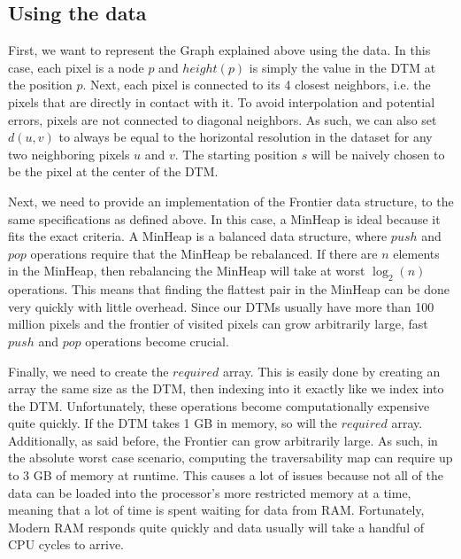 \documentclass[12pt]{article}
\begin{document}
\subsection{Using the data}
\label{sub:using_the_data}
\par First, we want to represent the Graph explained above using the data. In this case, each pixel is a node $p$ and $height(p)$ is simply the value in the DTM at the position $p$. Next, each pixel is connected to its 4 closest neighbors, i.e. the pixels that are directly in contact with it. To avoid interpolation and potential errors, pixels are not connected to diagonal neighbors. As such, we can also set $d(u,v)$ to always be equal to the horizontal resolution in the dataset for any two neighboring pixels $u$ and $v$. The starting position $s$ will be naively chosen to be the pixel at the center of the DTM.
\par Next, we need to provide an implementation of the Frontier data structure, to the same specifications as defined above. In this case, a MinHeap is ideal because it fits the exact criteria. A MinHeap is a balanced data structure, where $push$ and $pop$ operations require that the MinHeap be rebalanced. If there are $n$ elements in the MinHeap, then rebalancing the MinHeap will take at worst $\log_2(n)$ operations. This means that finding the flattest pair in the MinHeap can be done very quickly with little overhead. Since our DTMs usually have more than 100 million pixels and the frontier of visited pixels can grow arbitrarily large, fast $push$ and $pop$ operations become crucial.
\par Finally, we need to create the $required$ array. This is easily done by creating an array the same size as the DTM, then indexing into it exactly like we index into the DTM. Unfortunately, these operations become computationally expensive quite quickly. If the DTM takes 1 GB in memory, so will the $required$ array. Additionally, as said before, the Frontier can grow arbitrarily large. As such, in the absolute worst case scenario, computing the traversability map can require up to 3 GB of memory at runtime. This causes a lot of issues because not all of the data can be loaded into the processor's more restricted memory at a time, meaning that a lot of time is spent waiting for data from RAM. Fortunately, Modern RAM responds quite quickly and data usually will take a handful of CPU cycles to arrive.
\end{document}
